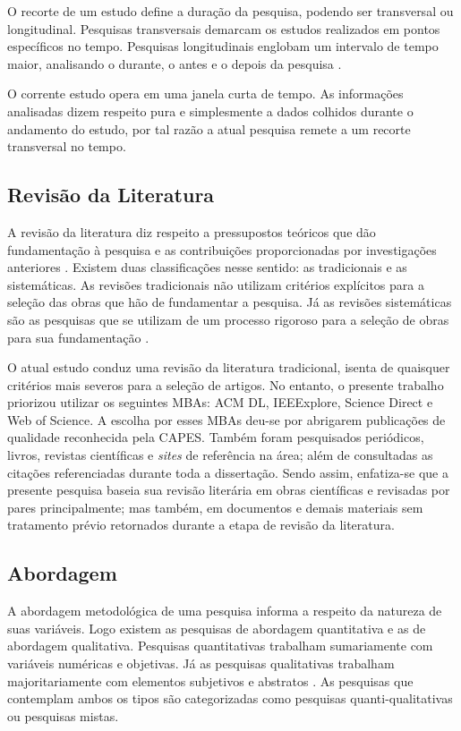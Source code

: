 O recorte de um estudo define a duração da pesquisa, podendo ser transversal ou longitudinal. Pesquisas transversais demarcam os estudos realizados em pontos específicos no tempo. Pesquisas longitudinais englobam um intervalo de tempo maior, analisando o durante, o antes e o depois da pesquisa \cite{hochman2005desenhos}. 

O corrente estudo opera em uma janela curta de tempo. As informações analisadas dizem respeito pura e simplesmente a dados colhidos durante o andamento do estudo, por tal razão a atual pesquisa remete a um recorte transversal no tempo. 

\subsection{Revisão da Literatura}\label{sub:Literatura}

A revisão da literatura diz respeito a pressupostos teóricos que dão fundamentação à pesquisa e as contribuições proporcionadas por investigações anteriores \cite{carlos2002elaborar}. Existem duas classificações nesse sentido: as tradicionais e as sistemáticas. As revisões tradicionais não utilizam critérios explícitos para a seleção das obras que hão de fundamentar a pesquisa. Já as revisões sistemáticas são as pesquisas que se utilizam de um processo rigoroso para a seleção de obras para sua fundamentação \cite{ferenhof2016desmistificando}.

O atual estudo conduz uma revisão da literatura tradicional, isenta de quaisquer critérios mais severos para a seleção de artigos. No entanto, o presente trabalho priorizou utilizar os seguintes \acfp{MBA}: ACM DL, IEEExplore, Science Direct e Web of Science. A escolha por esses \acp{MBA} deu-se por abrigarem publicações de qualidade reconhecida pela \ac{CAPES}. Também foram pesquisados periódicos, livros, revistas científicas e \textit{sites} de referência na área; além de consultadas as citações referenciadas durante toda a dissertação. Sendo assim, enfatiza-se que a presente pesquisa baseia sua revisão literária em obras científicas e revisadas por pares principalmente; mas também, em documentos e demais materiais sem tratamento prévio retornados durante a etapa de revisão da literatura. 

\subsection{Abordagem}\label{sub:Abordagem}

A abordagem metodológica de uma pesquisa informa a respeito da natureza de suas variáveis. Logo existem as pesquisas de abordagem quantitativa e as de abordagem qualitativa. Pesquisas quantitativas trabalham sumariamente com variáveis numéricas e objetivas. Já as pesquisas qualitativas trabalham majoritariamente com elementos subjetivos e abstratos \cite{carlos2002elaborar}. As pesquisas que contemplam ambos os tipos são categorizadas como pesquisas quanti-qualitativas ou pesquisas mistas. 


